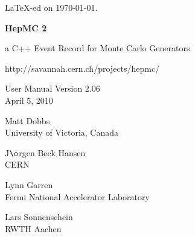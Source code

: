 \documentclass[11pt,letterpaper]{article}
\begin{document}
\newenvironment{fminipage}%
{\begin{Sbox}\begin{minipage}}%
{\end{minipage}\end{Sbox}\fbox{\TheSbox}}
%
%
%
\begin{titlepage}
{\tiny \LaTeX-ed on \today.}

\vspace{2cm}

\begin{center}

{\Huge\bf HepMC 2}

\vspace{1cm}

{\huge a C++ Event Record for Monte Carlo Generators }

\vspace{2cm}

{http://savannah.cern.ch/projects/hepmc/}

\vspace{1cm}

{\Large User Manual Version 2.06} \\
April 5, 2010

\vspace{2cm}

{\huge Matt Dobbs} \\
University of Victoria, Canada

\vspace{.2cm}

{\Large J$\o$rgen Beck Hansen} \\
CERN

\vspace{.2cm}

{\Large Lynn Garren} \\
Fermi National Accelerator Laboratory

\vspace{.2cm}

{\Large Lars Sonnenschein} \\
RWTH Aachen

\vspace{1cm}


\end{center}
\end{titlepage}
\end{document}
